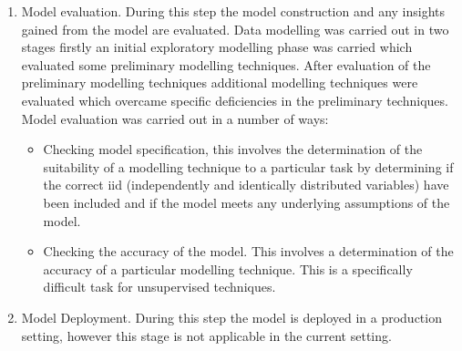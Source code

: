 \begin{enumerate}
\item Model evaluation. During this step the model construction and any insights gained from the model are evaluated. Data modelling was carried out in two stages firstly an initial exploratory modelling phase was carried which evaluated some preliminary modelling techniques. After evaluation of the preliminary modelling techniques additional modelling techniques were evaluated which overcame specific deficiencies in the preliminary techniques. Model evaluation was carried out in a number of ways:
\begin{itemize}
 \item Checking model specification, this involves the determination of the suitability of a modelling technique to a particular task by determining if the correct iid (independently and identically distributed variables) have been included and if the model meets any underlying assumptions of the model.
 \item Checking the accuracy of the model. This involves  a determination of the accuracy of a particular modelling technique. This is a specifically difficult task for unsupervised techniques.
 \end{itemize} 
\item Model Deployment. During this step the model is deployed in a production setting, however this stage is not applicable in the current setting. 
\end{enumerate}

